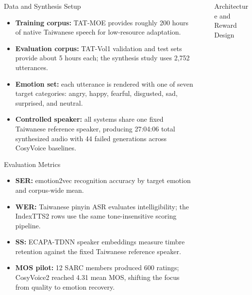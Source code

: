 \documentclass[final,20pt]{beamer}
\newlength{\sepwidth}
\newlength{\colwidth}
\newcommand{\separatorcolumn}{\begin{column}{\sepwidth}\end{column}}
\begin{document}
\begin{frame}[t]
\begin{columns}[t]
\begin{column}{\colwidth}
  \begin{block}{Data and Synthesis Setup}
    \begin{itemize}
      \item \textbf{Training corpus:} TAT-MOE provides roughly 200 hours of
      native Taiwanese speech for low-resource adaptation.
      \item \textbf{Evaluation corpus:} TAT-Vol1 validation and test sets provide
      about 5 hours each; the synthesis study uses 2,752 utterances.
      \item \textbf{Emotion set:} each utterance is rendered with one of seven
      target categories: angry, happy, fearful, disgusted, sad, surprised, and
      neutral.
      \item \textbf{Controlled speaker:} all systems share one fixed Taiwanese
      reference speaker, producing 27:04:06 total synthesized audio with 44
      failed generations across CosyVoice baselines.
    \end{itemize}
  \end{block}

  \begin{block}{Evaluation Metrics}
    \begin{itemize}
      \item \textbf{SER:} emotion2vec recognition accuracy by target emotion and
      corpus-wide mean.
      \item \textbf{WER:} Taiwanese pinyin ASR evaluates intelligibility; the
      IndexTTS2 rows use the same tone-insensitive scoring pipeline.
      \item \textbf{SS:} ECAPA-TDNN speaker embeddings measure timbre retention
      against the fixed Taiwanese reference speaker.
      \item \textbf{MOS pilot:} 12 SARC members produced 600 ratings; CosyVoice2
      reached 4.31 mean MOS, shifting the focus from quality to emotion recovery.
    \end{itemize}
  \end{block}

\end{column}

\separatorcolumn

\begin{column}{\colwidth}

  \begin{block}{Architecture and Reward Design}
    


\end{block}
\end{column}
\end{columns}
\end{frame}
\end{document}
